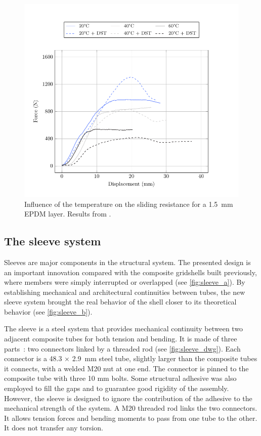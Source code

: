 \begin{figure}[p]
\centering
\begin{fullpage}
	\includegraphics[]{ch2_creteil/plot/2_epdm_temperature/build.pdf}
	\caption[Influence of the temperature on the sliding resistance]{Influence of the temperature on the sliding resistance for a \SI{1.5}{\mm} EPDM layer. Results from \cite{Tayeb2015a}.}
	\label{plot:epdm_temperature}
\end{fullpage}
\end{figure}


\clearpage
\subsection{The sleeve system}

Sleeves are major components in the structural system. The presented design is an important innovation compared with the composite gridshells built previously, where members were simply interrupted or overlapped (see \cref{fig:sleeve_a}). By establishing mechanical and architectural continuities between tubes, the new sleeve system brought the real behavior of the shell closer to its theoretical behavior (see \cref{fig:sleeve_b}).

The sleeve is a steel system that provides mechanical continuity between two adjacent composite tubes for both tension and bending. It is made of three parts~: two connectors linked by a threaded rod (see \cref{fig:sleeve_dwg}). Each connector is a 48.3 × \SI{2.9}{mm} steel tube, slightly larger than the composite tubes it connects, with a welded M20 nut at one end. The connector is pinned to the composite tube with three 10 mm bolts. Some structural adhesive was also employed to fill the gaps and to guarantee good rigidity of the assembly. However, the sleeve is designed to ignore the contribution of the adhesive to the mechanical strength of the system. A M20 threaded rod links the two connectors. It allows tension forces and bending moments to pass from one tube to the other. It does not transfer any torsion.

